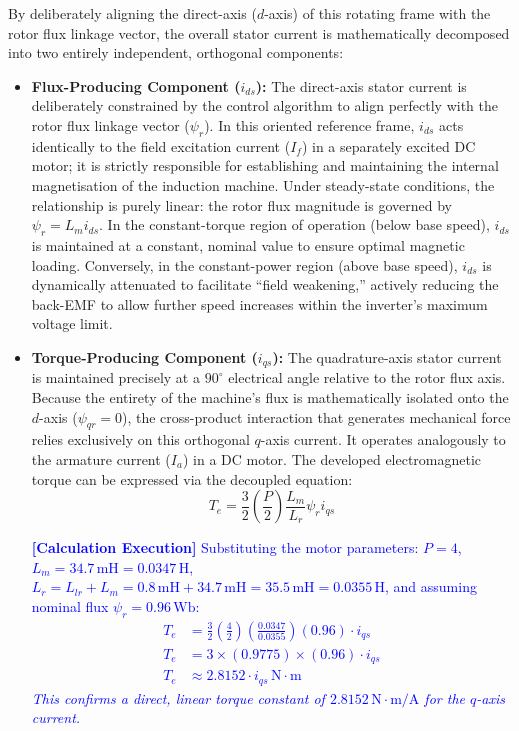 \documentclass[12pt]{article}
\begin{document}
By deliberately aligning the direct-axis ($d$-axis) of this rotating frame with the rotor flux linkage vector, the overall stator current is mathematically decomposed into two entirely independent, orthogonal components:
\begin{itemize}
    \item \textbf{Flux-Producing Component ($i_{ds}$):} The direct-axis stator current is deliberately constrained by the control algorithm to align perfectly with the rotor flux linkage vector ($\psi_r$). In this oriented reference frame, $i_{ds}$ acts identically to the field excitation current ($I_f$) in a separately excited DC motor; it is strictly responsible for establishing and maintaining the internal magnetisation of the induction machine. Under steady-state conditions, the relationship is purely linear: the rotor flux magnitude is governed by $\psi_r = L_m i_{ds}$. In the constant-torque region of operation (below base speed), $i_{ds}$ is maintained at a constant, nominal value to ensure optimal magnetic loading. Conversely, in the constant-power region (above base speed), $i_{ds}$ is dynamically attenuated to facilitate ``field weakening,'' actively reducing the back-EMF to allow further speed increases within the inverter's maximum voltage limit.

    \item \textbf{Torque-Producing Component ($i_{qs}$):} The quadrature-axis stator current is maintained precisely at a $90^\circ$ electrical angle relative to the rotor flux axis. Because the entirety of the machine's flux is mathematically isolated onto the $d$-axis ($\psi_{qr} = 0$), the cross-product interaction that generates mechanical force relies exclusively on this orthogonal $q$-axis current. It operates analogously to the armature current ($I_a$) in a DC motor. The developed electromagnetic torque can be expressed via the decoupled equation:
    \begin{equation}
        T_e = \frac{3}{2} \left(\frac{P}{2}\right) \frac{L_m}{L_r} \psi_r i_{qs}
    \end{equation}

    \textcolor{blue}{\textbf{[Calculation Execution]} Substituting the motor parameters: $P = 4$, $L_m = 34.7 \, \text{mH} = 0.0347 \, \text{H}$, $L_r = L_{lr} + L_m = 0.8 \, \text{mH} + 34.7 \, \text{mH} = 35.5 \, \text{mH} = 0.0355 \, \text{H}$, and assuming nominal flux $\psi_r = 0.96 \, \text{Wb}$:
    \begin{align*}
        T_e &= \frac{3}{2} \left(\frac{4}{2}\right) \left(\frac{0.0347}{0.0355}\right) (0.96) \cdot i_{qs} \\
        T_e &= 3 \times (0.9775) \times (0.96) \cdot i_{qs} \\
        T_e &\approx 2.8152 \cdot i_{qs} \, \text{N}\cdot\text{m}
    \end{align*}
    \textit{This confirms a direct, linear torque constant of $2.8152 \, \text{N}\cdot\text{m/A}$ for the $q$-axis current.}}


\end{itemize}
\end{document}
